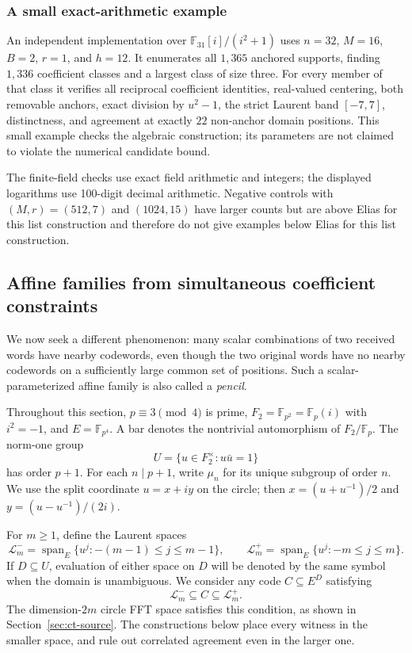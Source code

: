 \documentclass[11pt,letterpaper]{article}
\theoremstyle{definition}
\theoremstyle{remark}
\begin{document}
\subsubsection{A small exact-arithmetic example}
\label{rl:fixture}
An independent implementation over $\mathbb F_{31}[i]/(i^2+1)$ uses
$n=32$, $M=16$, $B=2$, $r=1$, and $h=12$. It enumerates all $1{,}365$
anchored supports, finding $1{,}336$ coefficient classes and a largest class
of size three. For every member of that class it verifies all reciprocal
coefficient identities, real-valued centering, both removable anchors,
exact division by $u^2-1$, the strict Laurent band $[-7,7]$, distinctness,
and agreement at exactly $22$ non-anchor domain positions. This small example checks the algebraic construction; its parameters
are not claimed to violate the numerical candidate bound.

The finite-field checks use exact field arithmetic and integers; the
displayed logarithms use 100-digit decimal arithmetic. Negative controls with $(M,r)=(512,7)$ and
$(1024,15)$ have larger counts but are above Elias for this list
construction and therefore do not give examples below Elias for this list construction.


\subsection{Affine families from simultaneous coefficient constraints}
\label{sec:ct-circle}

We now seek a different phenomenon: many scalar combinations of two
received words have nearby codewords, even though the two original words
have no nearby codewords on a sufficiently large common set of positions.
Such a scalar-parameterized affine family is also called a \emph{pencil}.

Throughout this section, $p\equiv3\pmod4$ is prime,
$F_2=\mathbb F_{p^2}=\mathbb F_p(i)$ with $i^2=-1$, and
$E=\mathbb F_{p^4}$. A bar denotes the nontrivial automorphism of
$F_2/\mathbb F_p$. The norm-one group
\[
  U=\{u\in F_2^\times:u\bar u=1\}
\]
has order $p+1$. For each $n\mid p+1$, write $\mu_n$ for its unique
subgroup of order $n$. We use the split coordinate $u=x+iy$ on the circle;
then $x=(u+u^{-1})/2$ and $y=(u-u^{-1})/(2i)$.

For $m\ge1$, define the Laurent spaces
\[
  \mathcal L^-_m=\operatorname{span}_E\{u^j:-(m-1)\le j\le m-1\},
  \qquad
  \mathcal L^+_m=\operatorname{span}_E\{u^j:-m\le j\le m\}.
\]
If $D\subseteq U$, evaluation of either space on $D$ will be denoted by
the same symbol when the domain is unambiguous. We consider any code
$C\subseteq E^D$ satisfying
\begin{equation}\label{eq:ct-band}
  \mathcal L^-_m\subseteq C\subseteq\mathcal L^+_m.
\end{equation}
The dimension-$2m$ circle FFT space satisfies this condition, as shown in
Section~\ref{sec:ct-source}. The constructions below place every witness
in the smaller space, and rule out correlated agreement even in the larger one.
\end{document}
